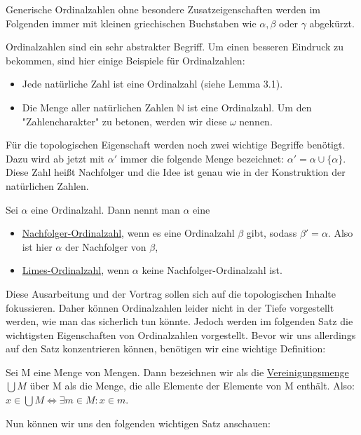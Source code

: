 \documentclass[11pt]{scrartcl}
\newcommand{\N}{\mathbb{N}}
\begin{document}
\noindent Generische Ordinalzahlen ohne besondere Zusatzeigenschaften werden im Folgenden immer mit kleinen griechischen Buchstaben wie $\alpha, \beta$ oder $\gamma$ abgekürzt.
\begin{example}Ordinalzahlen sind ein sehr abstrakter Begriff. Um einen besseren Eindruck zu bekommen, sind hier einige Beispiele für Ordinalzahlen:
	\begin{itemize}
		\item Jede natürliche Zahl ist eine Ordinalzahl (siehe Lemma 3.1).
		\item Die Menge aller natürlichen Zahlen $\N$ ist eine Ordinalzahl. Um den "Zahlencharakter" zu betonen, werden wir diese $\omega$ nennen.
	\end{itemize}
\end{example}
Für die topologischen Eigenschaft werden noch zwei wichtige Begriffe benötigt. Dazu wird ab jetzt mit $\alpha '$ immer die folgende Menge bezeichnet: $\alpha' = \alpha \cup \{ \alpha \}$. Diese Zahl heißt Nachfolger und die Idee ist genau wie in der Konstruktion der natürlichen Zahlen.
\begin{definition}
Sei $\alpha$ eine Ordinalzahl. Dann nennt man $\alpha$ eine 
\begin{itemize}
	\item \underline{Nachfolger-Ordinalzahl}, wenn es eine Ordinalzahl $\beta$ gibt, sodass $\beta'=\alpha$. Also ist hier $\alpha$ der Nachfolger von $\beta$,
	\item \underline{Limes-Ordinalzahl}, wenn $\alpha$ keine Nachfolger-Ordinalzahl ist.
\end{itemize}
\end{definition}
\noindent Diese Ausarbeitung und der Vortrag sollen sich auf die topologischen Inhalte fokussieren. Daher können Ordinalzahlen leider nicht in der Tiefe vorgestellt werden, wie man das sicherlich tun könnte. Jedoch werden im folgenden Satz die wichtigsten Eigenschaften von Ordinalzahlen vorgestellt. Bevor wir uns allerdings auf den Satz konzentrieren können, benötigen wir eine wichtige Definition:
\begin{definition}
	Sei M eine Menge von Mengen. Dann bezeichnen wir als die \underline{Vereinigungsmenge $\bigcup M$} über M als die Menge, die alle Elemente der Elemente von M enthält. Also: $x\in \bigcup M \iff \exists m\in M: x\in m$.
\end{definition}
\noindent Nun können wir uns den folgenden wichtigen Satz anschauen:
\end{document}
